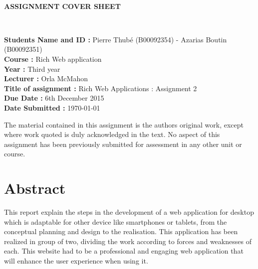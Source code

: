 \documentclass[12pt]{report}%
\begin{document}
\begin{titlepage}
\begin{center}
 \\[0.4cm]

{ \Huge \textbf{ASSIGNMENT COVER SHEET} \\[0.4cm] }
\end{center}\mbox{}\\[1cm]
\begin{Large}
{
\textbf{Students Name and ID : }Pierre Thubé (B00092354) -  Azarias Boutin (B00092351) \\
\textbf{Course : } Rich Web application\\
\textbf{Year : } Third year\\
\textbf{Lecturer : } Orla McMahon \\
\textbf{Title of assignment : } Rich Web Applications : Assignment 2 \\
\textbf{Due Date : } 6th December 2015 \\
\textbf{Date Submitted :} \today  \\
\par}

\end{Large}

\begin{justify}
The material contained in this assignment is the authors original work, except where work quoted is duly acknowledged in the text. No aspect of this assignment has been previously submitted for assessment in any other unit or course.  
\end{justify}
\end{titlepage}

\setcounter{page}{2}

\chapter*{Abstract}
This report explain the steps in the development of a web application for desktop which is adaptable for other device like smartphones or tablets, from the conceptual planning and design to the realisation. This application has been realized in group of two, dividing the work according to forces and weaknesses of each. This website had to be a professional and engaging web application that will enhance the user experience when using it. 
\end{document}
